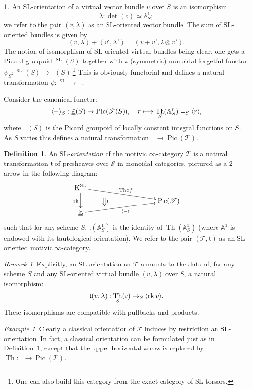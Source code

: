 \documentclass[11pt]{article}
\makeatletter
\numberwithin{equation}{section}\renewcommand{\encodingdefault}{TU}
\def\mto{\mathchoice{\longmapsto}{\mapsto}{\mapsto}{\mapsto}}
\DeclareRobustCommand{\mathbbm}[1]{\csname jepbb@#1\endcsname}
\newcommand{\base}{\mathscr S}
\newcommand{\T}{\mathscr T}
\DeclareMathOperator{\uK}{\underline K}
\DeclareMathOperator{\uZZ}{\underline{\ZZ}}
\DeclareMathOperator{\rk}{rk}
\renewcommand{\AA}{\mathbb A}
\newcommand{\un}{\mathbbm 1}
\newcommand{\SL}{\mathrm{SL}}
\newcommand{\thom}{\mathfrak t}
\DeclareMathOperator{\Pic}{Pic}
\newcommand{\twist}[1]{\langle #1 \rangle}
\DeclareMathOperator{\Th}{Th}
\newcommand{\ZZ} {\mathbb Z}
\theoremstyle{remark}
\newtheorem{rem}[thm]{Remark}
\newtheorem{ex}[thm]{Example}
\theoremstyle{definition}
\newtheorem{df}[thm]{Definition}
\newtheorem{num}[thm]{}
\numberwithin{equation}{thm}
\makeatother
\begin{document}
\begin{num}\label{num:Thom&SL_orientation}
An $\SL$-orientation of a virtual vector bundle $v$ over $S$ is an isomorphism
\[\lambda:\det(v) \simeq \AA^1_S;\]
we refer to the pair $(v,\lambda)$ as an $\SL$-oriented vector bundle.
The sum of $\SL$-oriented bundles is given by
\[
(v,\lambda)+(v',\lambda')=(v+v',\lambda \otimes v').
\]
The notion of isomorphism of $\SL$-oriented virtual bundles being clear,
one gets a Picard groupoid $\uK^\SL(S)$ together with a (symmetric) monoidal forgetful
functor \hbox{$\psi_S:\uK^\SL(S) \to \uK(S)$}.\footnote{One can also build this category
from the exact category of $\SL$-torsors.} This is obviously functorial and defines a natural transformation $\psi : \uK^\SL \to \uK$.
\end{num}

Consider the canonical functor:
\[
\twist -_S:\uZZ(S) \to \Pic(\T(S)),
\quad
r \mto \Th_S(\AA^{r}_S)=\un_S\twist r,
\]
where $\uZZ(S)$ is the Picard groupoid of locally constant integral functions on $S$.
As $S$ varies this defines a natural transformation $\uZZ \to \Pic(\T)$.

\begin{df}\label{df:SL-orientation}
An \emph{$\SL$-orientation} of the motivic $\infty$-category $\T$ is a natural transformation $\thom$ of presheaves over $\base$
in monoidal categories, pictured as a $2$-arrow in the following diagram:
\[
\xymatrix@C=20pt@R=-2pt{
\uK^{\SL}\ar^{\Th \circ f}[rrrrdd]\ar_{\rk}[dddd] &&&& \\
& \ar@{=>}^{\thom}[dd] & & & \\
&&&& \Pic(\T) \\
&&&& \\
\uZZ\ar_{\twist -}[rrrruu] &&&&
}
\]
such that for any scheme $S$, $\thom(\AA^1_S)$ is the identity of $\Th(\AA^1_S)$ (where $\AA^1$ is endowed with its tautological orientation).
We refer to the pair $(\T,\thom)$ as an $\SL$-oriented motivic $\infty$-category.
\end{df}

\begin{rem}\label{rem:SL-orientation}
Explicitly, an $\SL$-orientation on $\T$ amounts to the data of, for any scheme $S$ and any $\SL$-oriented virtual bundle $(v,\lambda)$ over $S$,
a natural isomorphism:
\[
\thom(v,\lambda):\Th_S(v) \to \un_S\twist{\rk v}.
\]
These isomorphisms are compatible with pullbacks and products.
\end{rem}

\begin{ex}
Clearly a classical orientation of $\T$ induces by restriction
an $\SL$\nobreakdash-ori\-en\-tation.
In fact, a classical orientation can be formulated just as in Definition~\ref{df:SL-orientation}, except that the upper horizontal arrow is replaced by $\Th: \uK \to \Pic(\T)$.
\end{ex}
\end{document}
